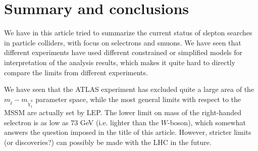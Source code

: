 \documentclass[twocolumn,a4paper,10pt]{article}
\begin{document}
\section{Summary and conclusions}

We have in this article tried to summarize the current status of slepton searches in particle 
colliders, with focus on selectrons and smuons. We have seen that different experiments have used 
different constrained or simplified models for interpretation of the analysis results, which makes it 
quite hard to directly compare the limits from different experiments.   

We have seen that the ATLAS experiment has excluded quite a large area of the 
$m_{\tilde{\ell}}-m_{\tilde{\chi}_1^0}$ parameter space, while the most general limits with respect 
to the MSSM are actually set by LEP. The lower limit on mass of the right-handed selectron is as 
low as $73$ GeV (i.e. lighter than the $W$-boson), which somewhat answers the question imposed in 
the title of this article. However, stricter limits (or discoveries?) can possibly be made with the
LHC in the future.   

\end{document}
